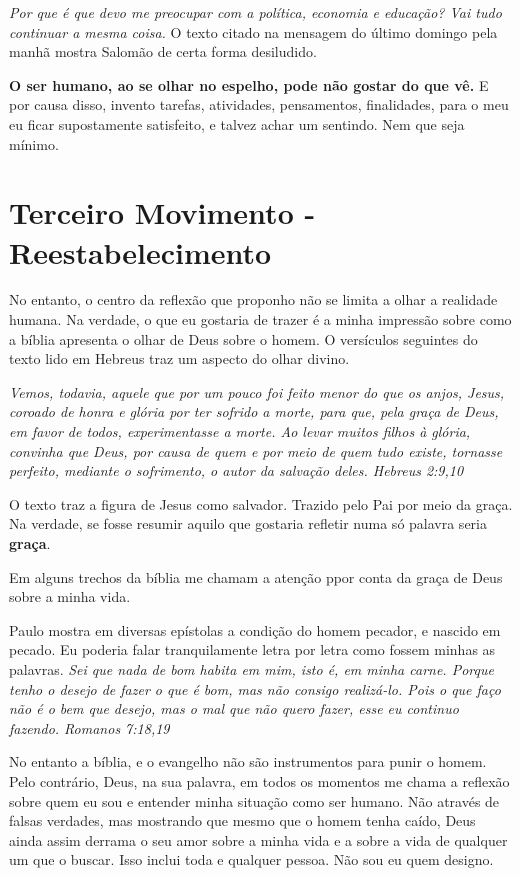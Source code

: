 \documentclass[12pt, legalpaper]{article}
\begin{document}
\emph{Por que é que devo me preocupar com a política, economia e educação? Vai tudo continuar a mesma coisa.} 
O texto citado na mensagem do último domingo pela manhã mostra Salomão de certa forma desiludido. 

\textbf{O ser humano, ao se olhar no espelho, pode não gostar do que vê.}
E por causa disso, invento tarefas, atividades, pensamentos, finalidades, para o meu eu ficar supostamente satisfeito, e talvez achar um sentindo. Nem que seja mínimo.

\newpage
\section{Terceiro Movimento - Reestabelecimento}

No entanto, o centro da reflexão que proponho não se limita a olhar a realidade humana.
Na verdade, o que eu gostaria de trazer é a minha impressão sobre como a bíblia apresenta o olhar de Deus sobre o homem. O versículos seguintes do texto lido em Hebreus traz um aspecto do olhar divino. 

\emph{Vemos, todavia, aquele que por um pouco foi feito menor do que os anjos, Jesus, coroado de honra e glória por ter sofrido a morte, para que, pela graça de Deus, em favor de todos, experimentasse a morte. Ao levar muitos filhos à glória, convinha que Deus, por causa de quem e por meio de quem tudo existe, tornasse perfeito, mediante o sofrimento, o autor da salvação deles. Hebreus 2:9,10}

O texto traz a figura de Jesus como salvador. Trazido pelo Pai por meio da graça. Na verdade, se fosse resumir aquilo que gostaria refletir numa só palavra seria \textbf{graça}.

Em alguns trechos da bíblia me chamam a atenção ppor conta da graça de Deus sobre a minha vida.

Paulo mostra em diversas epístolas a condição do homem pecador, e nascido em pecado. Eu poderia falar tranquilamente letra por letra como fossem minhas as palavras.
\emph{Sei que nada de bom habita em mim, isto é, em minha carne. Porque tenho o desejo de fazer o que é bom, mas não consigo realizá-lo. Pois o que faço não é o bem que desejo, mas o mal que não quero fazer, esse eu continuo fazendo. Romanos 7:18,19}

No entanto a bíblia, e o evangelho não são instrumentos para punir o homem. Pelo contrário, Deus, na sua palavra, em todos os momentos me chama a reflexão sobre quem eu sou e entender minha situação como ser humano. Não através de falsas verdades, mas mostrando que mesmo que o homem tenha caído, Deus ainda assim derrama o seu amor sobre a minha vida e a sobre a vida de qualquer um que o buscar. Isso inclui toda e qualquer pessoa. Não sou eu quem designo.
\end{document}
